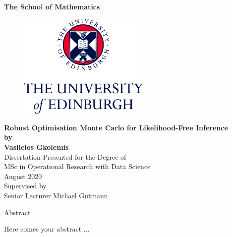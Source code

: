 \documentclass[11pt,twoside]{article}
\numberwithin{Theorem}{section}
\numberwithin{Definition}{section}
\numberwithin{Lemma}{section}
\numberwithin{Algorithm}{section}
\numberwithin{equation}{section}
\begin{document}
\pagestyle{empty}

\begin{titlepage}
\vspace*{.5em}
\center
\textbf{\large{The School of Mathematics}} \\
\vspace*{1em}
\begin{figure}[!h]
\centering
\includegraphics[width=180pt]{images/CentredLogoCMYK.jpg}
\end{figure}
\vspace{2em}
\textbf{\Huge{Robust Optimisation Monte Carlo for Likelihood-Free Inference}}\\[2em]
\textbf{\LARGE{by}}\\
\vspace{2em}
\textbf{\LARGE{Vasileios Gkolemis}}\\
\vspace{6.5em}
\Large{Dissertation Presented for the Degree of\\
MSc in Operational Research with Data Science}\\
\vspace{6.5em}
\Large{August 2020}\\
\vspace{3em}
\Large{Supervised by\\Senior Lecturer Michael Gutmann}
\vfill
\end{titlepage}

\cleardoublepage

\begin{center}
\Large{Abstract}
\end{center}

Here comes your abstract ...
\end{document}
